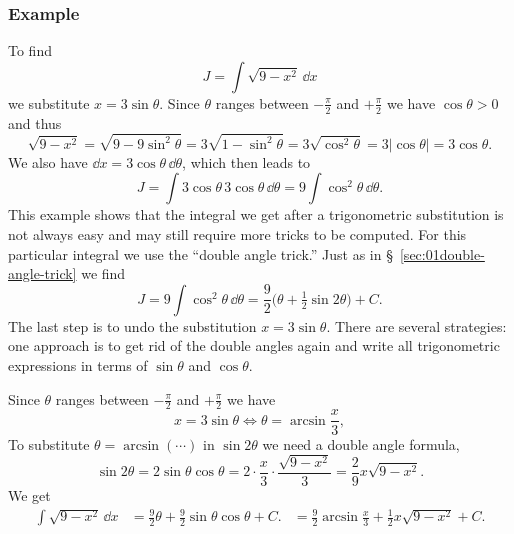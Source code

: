 \subsubsection{Example}
To find
\[
J = \int \sqrt{9-x^2}\, \dd x
\]
we substitute $x=3\sin\theta$.  Since $\theta$ ranges between $-\frac\pi2$ and
$+\frac\pi2$ we have $\cos\theta>0$ and thus
\[
  \sqrt{9-x^2} = \sqrt{9-9\sin^2\theta} = 3\sqrt{1-\sin^2\theta}
  =3\sqrt{\cos^2\theta} 
  =3|\cos \theta|
  =3\cos \theta.
\]
We also have $\dd x=3\cos\theta\,\dd\theta$, which then leads to 
\[
J = \int 3\cos\theta \, 3\cos\theta\,\dd\theta = 9\int\cos^2\theta\, \dd\theta.
\]
This example shows that the integral we get after a trigonometric substitution
is not always easy and may still require more tricks to be computed.  For this
particular integral we use the ``double angle trick.''   Just as in \S~\ref{sec:01double-angle-trick} we
find
\[
J= 9\int\cos^2\theta\, \dd\theta =\frac92 \bigl(\theta + \tfrac12
\sin2\theta\bigr) +C.
\]
The last step is to undo the substitution $x=3\sin\theta$.
There are several strategies: one approach is to get rid of the double angles
again and write all trigonometric expressions in terms of $\sin\theta$ and
$\cos\theta$.

Since $\theta$ ranges between $-\frac\pi2$ and $+\frac\pi2$ we have
\[
x=3\sin\theta \iff \theta = \arcsin \frac{x}{3},
\]
To substitute $\theta = \arcsin (\cdots)$ in $\sin 2\theta$ we need a double
angle formula,
\[
\sin 2\theta = 2\sin\theta \cos \theta = 2\cdot \frac{x}{3} \cdot
\frac{\sqrt{9-x^2}}{3}
= \frac{2}{9}x\sqrt{9-x^2}.
\]
We get
\begin{align*}
\int \sqrt{9-x^2}\, \dd x
&= \frac92 \theta + \frac92 \sin\theta\cos\theta + C.
&= \frac92 \arcsin\frac{x}{3} + \frac12 x\sqrt{9-x^2} + C.
\end{align*}



